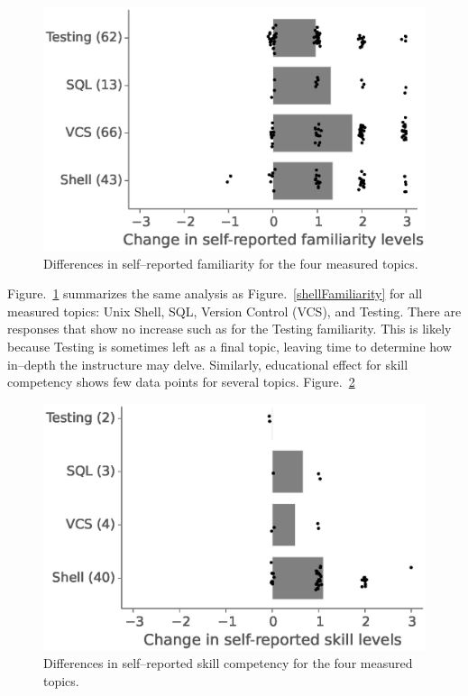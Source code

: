 \documentclass[10pt, twocolumn]{article}
\begin{document}
	\begin{figure}
	\centering
	\includegraphics[width=\linewidth]{figures/AvgFamiliarityEffect}
	\caption{
	    Differences in self--reported familiarity for the four measured topics.
	}
	\label{AvgFamiliarityEffect}
	\end{figure}
	
	Figure.~\ref{AvgFamiliarityEffect} summarizes the same analysis as Figure.~\ref{shellFamiliarity}
	for all measured topics: Unix Shell, SQL, Version Control (VCS), and Testing.
	There are responses that show no increase such as for the Testing familiarity.
	This is likely because Testing is sometimes left as a final topic,
	leaving time to determine how in--depth the instructure may delve. 
	Similarly, educational effect for skill competency
	shows few data points for several topics. Figure.~\ref{AvgSkillEffect}
	
	\begin{figure}
	\centering
	\includegraphics[width=\linewidth]{figures/AvgSkillEffect}
	\caption{
	    Differences in self--reported skill competency for the four measured topics.
	}
	\label{AvgSkillEffect}
	\end{figure}
	
\end{document}
